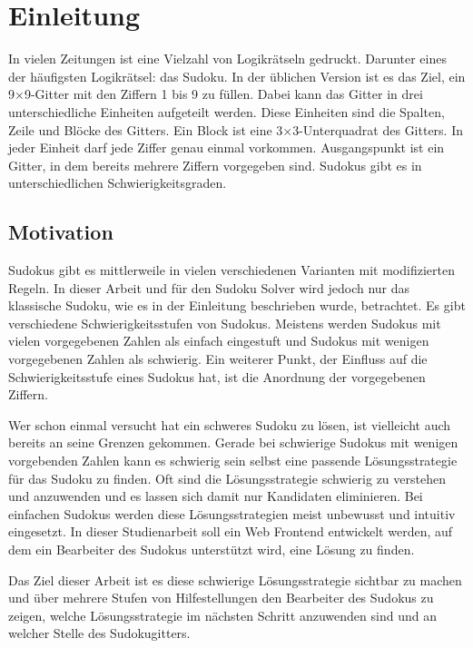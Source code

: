 
\chapter{Einleitung}
In vielen Zeitungen ist eine Vielzahl von Logikrätseln gedruckt. Darunter eines der häufigsten Logikrätsel: das Sudoku.
In der üblichen Version ist es das Ziel, ein 9×9-Gitter mit den Ziffern 1 bis 9 zu füllen. Dabei kann das Gitter in drei unterschiedliche Einheiten aufgeteilt werden. Diese Einheiten sind die Spalten, Zeile und Blöcke des Gitters. Ein Block ist eine 3×3-Unterquadrat des Gitters. In jeder Einheit darf jede Ziffer genau einmal vorkommen.
Ausgangspunkt ist ein Gitter, in dem bereits mehrere Ziffern vorgegeben sind. Sudokus gibt es in unterschiedlichen Schwierigkeitsgraden. 

 

\section{Motivation}
Sudokus gibt es mittlerweile in vielen verschiedenen Varianten mit modifizierten Regeln. In dieser Arbeit und für den Sudoku Solver wird jedoch nur das klassische Sudoku, wie es in der Einleitung beschrieben wurde, betrachtet. Es gibt verschiedene Schwierigkeitsstufen von Sudokus. Meistens werden Sudokus mit vielen vorgegebenen Zahlen als einfach eingestuft und Sudokus mit wenigen vorgegebenen Zahlen als schwierig. Ein weiterer Punkt, der Einfluss auf die Schwierigkeitsstufe eines Sudokus hat, ist die Anordnung der vorgegebenen Ziffern.

Wer schon einmal versucht hat ein schweres Sudoku  zu lösen, ist vielleicht auch bereits an seine Grenzen gekommen. Gerade bei schwierige Sudokus mit wenigen vorgebenden Zahlen kann es schwierig sein selbst eine passende Lösungsstrategie für das Sudoku zu finden. Oft sind die Lösungsstrategie schwierig zu verstehen und anzuwenden und es lassen sich damit nur Kandidaten eliminieren. Bei einfachen Sudokus werden diese Lösungsstrategien meist unbewusst und intuitiv eingesetzt. In dieser Studienarbeit soll ein Web Frontend entwickelt werden, auf dem ein Bearbeiter des Sudokus unterstützt wird, eine Lösung zu finden.

Das Ziel dieser Arbeit ist es diese schwierige Lösungsstrategie sichtbar zu machen und über mehrere Stufen von Hilfestellungen den Bearbeiter des Sudokus zu zeigen, welche Lösungsstrategie im nächsten Schritt anzuwenden sind und an welcher Stelle des Sudokugitters. 



